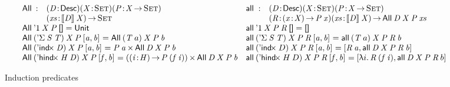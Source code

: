 \begin{figure*}

\[
\begin{array}{ll}
\stk{
\begin{array}{@{}ll}
\All{\!}{\!}{\!}{\!} : & \PITEL{\V{D}}{\Desc}
                         \PITEL{\V{X}}{\Set}
                         \PITEL{\V{P}}{\V{X} \To \Set} \\
                       & \PI{\V{xs}}{\descop{\V{D}}{\V{X}}} 
                         \Set 
\end{array} \\
\All{\DUnit}{\V{X}}{\V{P}}{\Void} = 
    \Unit \\
\All{(\DSigma{\V{S}}{\V{T}})}{\V{X}}{\V{P}}{\pair{\V{a}}{\V{b}}{}} = 
    \All{(\V{T}\: a)}{\V{X}}{\V{P}}{\V{b}} \\
\All{(\DIndx{\V{D}})}{\V{X}}{\V{P}}{\pair{\V{a}}{\V{b}}{}} =
    \TIMES{\V{P}\: \V{a}}{\All{\V{D}}{\V{X}}{\V{P}}{\V{b}}} \\
\All{(\DHindx{\V{H}}{\V{D}})}{\V{X}}{\V{P}}{\pair{\V{f}}{\V{b}}{}} =
    \TIMES{(\PI{\V{i}}{\V{H}} \V{P}\: (\V{f}\: \V{i}))}
          {\All{\V{D}}{\V{X}}{\V{P}}{\V{b}}}
}
&
\stk{
\begin{array}{@{}ll}
\all{\!}{\!}{\!}{\!}{\!} : & \PITEL{\V{D}}{\Desc}
                             \PITEL{\V{X}}{\Set}
                             \PITEL{\V{P}}{\V{X} \To \Set} \\
                           & \PITEL{\V{R}}{\PI{\V{x}}{\V{X}} \V{P}\: \V{x}}
                             \PI{\V{xs}}{\descop{\V{D}}{\V{X}}} 
                             \All{\V{D}}{\V{X}}{\V{P}}{\V{xs}} 
\end{array} \\
\all{\DUnit}{\V{X}}{\V{P}}{\V{R}}{\Void} =
    \Void \\
\all{(\DSigma{\V{S}}{\V{T}})}{\V{X}}{\V{P}}{\V{R}}{\pair{\V{a}}{\V{b}}{}} =
    \all{(\V{T}\: a)}{\V{X}}{\V{P}}{\V{R}}{\V{b}} \\
\all{(\DIndx{D})}{\V{X}}{\V{P}}{\V{R}}{\pair{\V{a}}{\V{b}}{}} =
    \pair{\V{R}\: \V{a}}
         {\all{\V{D}}{\V{X}}{\V{P}}{\V{R}}{\V{b}}}{} \\
\all{(\DHindx{H}{D})}{\V{X}}{\V{P}}{\V{R}}{\pair{\V{f}}{\V{b}}{}} =
    \pair{\LAM{i} \V{R}\: (\V{f}\: \V{i})}
         {\all{\V{D}}{\V{X}}{\V{P}}{\V{R}}{b}}{}
\end{array}
}
\]

\caption{Induction predicates}
\label{fig:all-predicates}

\end{figure*}

